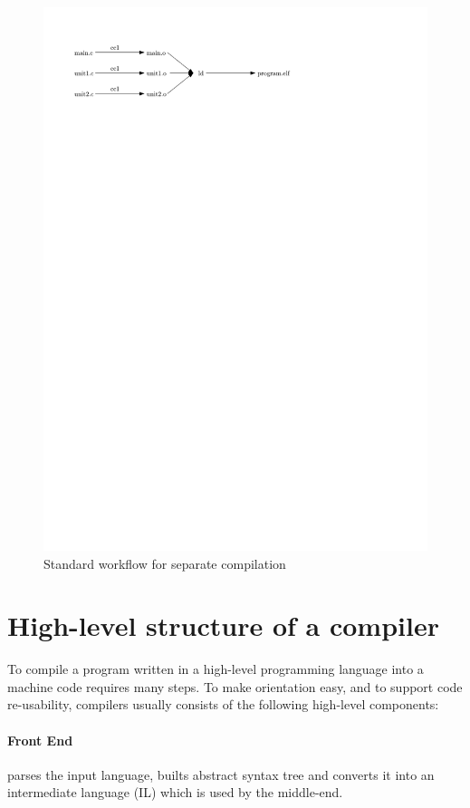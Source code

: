\begin{figure}[!ht]
\centering
\includegraphics{./img/non-lto-workflow.pdf}
\caption{Standard workflow for separate compilation}
\label{figure-non-lto-workflow}
\end{figure}


\section{High-level structure of a compiler}

To compile a program written in a high-level programming language into a machine
code requires many steps. To make orientation easy, and to support code
re-usability, compilers usually consists of the following high-level components:

\paragraph{Front End} parses the input language, builts abstract syntax
tree and converts it into an intermediate language (IL) which is used by the
middle-end.

